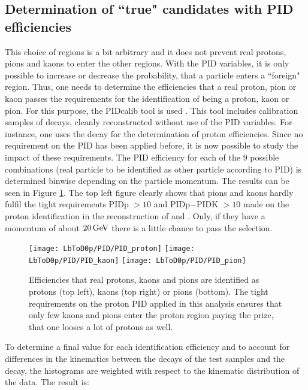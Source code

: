 \subsection{Determination of ``true" candidates with PID efficiencies}
This choice of regions is a bit arbitrary and it does not prevent real protons, pions and kaons to enter the other regions.
With the PID variables, it is only possible to increase or decrease the probability, that a particle enters a ``foreign" region.
Thus, one needs to determine the efficiencies that a real proton, pion or kaon passes the requirements for the identification of being a proton, kaon or pion.
For this purpose, the \lhcb PIDcalib tool is used \cite{PIDcalib}.
This tool includes calibration samples of decays, cleanly reconstructed without use of the PID variables. 
For instance, one uses the decay \decay{\Lambda}{\proton\pim} for the determination of proton efficiencies.
Since no requirement on the PID has been applied before, it is now possible to study the impact of these requirements.
The PID efficiency for each of the 9 possible combinations (real particle to be identified as other particle according to PID) is determined binwise depending on the particle momentum. 
The results can be seen in Figure \ref{fig:PIDefficiencies}.
The top left figure clearly shows that pions and kaons hardly fulfil the tight requirements PIDp $>10$ and PIDp$-$PIDK $>10$ made on the proton identification in the reconstruction of \LbToDpmunuX and \LbToLcmunu.
Only, if they have a momentum of about $20 \mathrm{\,Ge\kern -0.1em V}$ there is a little chance to pass the selection.
\begin{figure}[tb]
	\centering
	\texttt{[image: LbToD0p/PID/PID\_proton]}
	\texttt{[image: LbToD0p/PID/PID\_kaon]}
	\texttt{[image: LbToD0p/PID/PID\_pion]}
	\caption{Efficiencies that real protons, kaons and pions are identified as protons (top left), kaons (top right) or pions (bottom). The tight requirements on the proton PID applied in this analysis ensures that only few kaons and pions enter the proton region paying the prize, that one looses a lot of
    protons as well.}
	\label{fig:PIDefficiencies}
\end{figure}
To determine a final value for each identification efficiency and to account for differences in the kinematics between the decays of the test samples and the \LbToDpmunuX decay, the histograms are weighted with respect to the kinematic distribution of the \LbToDpmunuX data.
The result is:

